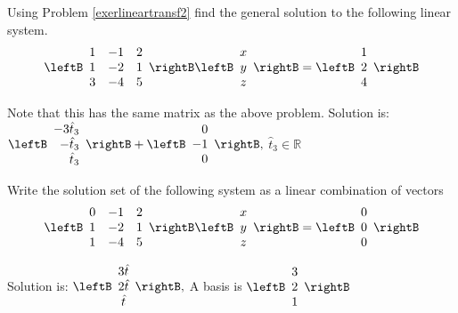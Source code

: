 \begin{enumialphparenastyle}
\begin{ex} Using Problem \ref{exerlineartransf2} find the general solution to the following 
linear system.
\begin{equation*}
\leftB
\begin{array}{rrr}
1 & -1 & 2 \\
1 & -2 & 1 \\
3 & -4 & 5
\end{array}
\rightB \leftB
\begin{array}{c}
x \\
y \\
z
\end{array}
\rightB =\leftB
\begin{array}{r}
1 \\
2 \\
4
\end{array}
\rightB 
\end{equation*}
\begin{sol}
Note that this has the same matrix as the above problem. Solution is: $%
\leftB
\begin{array}{r}
-3\hat{t}_{3} \\
-\hat{t}_{3} \\
\hat{t}_{3}
\end{array}
\rightB +\leftB
\begin{array}{r}
0 \\
-1 \\
0
\end{array}
\rightB ,$ $\hat{t}_{3}\in \mathbb{R}$
\end{sol}
\end{ex}

\begin{ex} \label{exerlineartransf3}Write the solution set of the following system as a linear combination of vectors
\begin{equation*}
\leftB
\begin{array}{rrr}
0 & -1 & 2 \\
1 & -2 & 1 \\
1 & -4 & 5
\end{array}
\rightB \leftB
\begin{array}{c}
x \\
y \\
z
\end{array}
\rightB =\leftB
\begin{array}{r}
0 \\
0 \\
0
\end{array}
\rightB 
\end{equation*}
\begin{sol}
Solution is: $\leftB
\begin{array}{c}
3\hat{t} \\
2\hat{t} \\
\hat{t}
\end{array}
\rightB ,$ A basis is $\leftB
\begin{array}{c}
3 \\
2 \\
1
\end{array}
\rightB $
\end{sol}
\end{ex}


\end{enumialphparenastyle}
